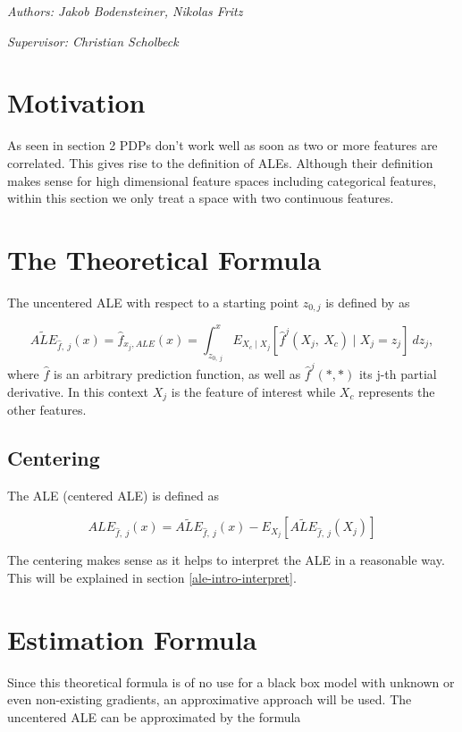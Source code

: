 \documentclass[]{krantz}
\begin{document}
\emph{Authors: Jakob Bodensteiner, Nikolas Fritz}

\emph{Supervisor: Christian Scholbeck}

\section{Motivation}\label{motivation-1}

As seen in section 2 PDPs don't work well as soon as two or more
features are correlated. This gives rise to the definition of ALEs.
Although their definition makes sense for high dimensional feature
spaces including categorical features, within this section we only treat
a space with two continuous features.

\section{The Theoretical Formula}\label{ale-intro-formula}

The uncentered ALE with respect to a starting point \(z_{0, j}\) is
defined by \citep{Apley2016} as

\[  \widetilde{ALE}_{\hat{f},~j}(x) = \hat{f}_{x_j,ALE}(x) = \int_{z_{0,~j}}^{x} E_{X_c \mid X_j} [\hat{f}^j(X_j,~X_c)\mid X_j = z_j]~dz_j,\]
where \(\hat{f}\) is an arbitrary prediction function, as well as
\(\hat{f}^j(*,*)\) its j-th partial derivative. In this context \(X_j\)
is the feature of interest while \(X_c\) represents the other features.

\subsection{Centering}\label{centering}

The ALE (centered ALE) is defined as

\[  ALE_{\hat{f},~j}(x) = \widetilde{ALE}_{\hat{f},~j}(x) - E_{X_j}[\widetilde{ALE}_{\hat{f},~j}(X_j)]\]

The centering makes sense as it helps to interpret the ALE in a
reasonable way. This will be explained in section
\ref{ale-intro-interpret}.

\section{Estimation Formula}\label{estimation-formula}

Since this theoretical formula is of no use for a black box model with
unknown or even non-existing gradients, an approximative approach will
be used. The uncentered ALE can be approximated by the formula
\end{document}
